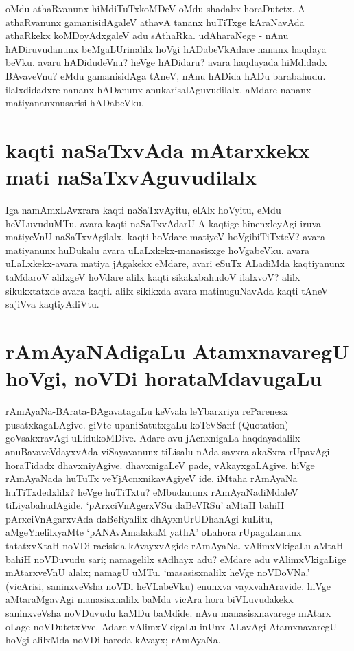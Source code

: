 oMdu athaRvanunx hiMdiTuTxkoMDeV oMdu shadabx horaDutetx. A athaRvanunx gamanisidAgaleV athavA tananx huTiTxge kAraNavAda athaRkekx  koMDoyAdxgaleV adu sAthaRka. udAharaNege - nAnu hADiruvudanunx beMgaLUrinalilx hoVgi hADabeVkAdare nananx haqdaya beVku. avaru hADidudeVnu? heVge hADidaru? avara haqdayada hiMdidadx BAvaveVnu? eMdu gamanisidAga tAneV, nAnu hADida hADu barabahudu. ilalxdidadxre nananx hADanunx anukarisalAguvudilalx. aMdare nananx matiyananxnusarisi hADabeVku.

\section*{kaqti naSaTxvAda mAtarxkekx mati naSaTxvAguvudilalx}

Iga namAmxLAvxrara kaqti naSaTxvAyitu, elAlx hoVyitu, eMdu heVLuvuduMTu. avara kaqti naSaTxvAdarU A kaqtige hinenxleyAgi iruva matiyeVnU naSaTxvAgilalx. kaqti hoVdare matiyeV hoVgibiTiTxteV? avara matiyanunx huDukalu avara uLaLxkekx-manasisxge hoVgabeVku. avara uLaLxkekx-avara matiya jAgakekx eMdare, avari eSuTx ALadiMda kaqtiyanunx taMdaroV alilxgeV hoVdare alilx kaqti sikakxbahudoV ilalxvoV? alilx sikukxtatxde avara kaqti. alilx sikikxda avara matinuguNavAda kaqti tAneV sajiVva kaqtiyAdiVtu.

\section*{rAmAyaNAdigaLu AtamxnavaregU hoVgi, noVDi horataMdavugaLu}

rAmAyaNa-BArata-BAgavatagaLu keVvala leYbarxriya reParenesx pusatxkagaLAgive. giVte-upaniSatutxgaLu koTeVSanf ({\eng Quotation}) goVsakxravAgi uLidukoMDive. Adare avu jAcnxnigaLa haqdayadalilx anuBavaveVdayxvAda viSayavanunx tiLisalu nAda-savxra-akaSxra rUpavAgi horaTidadx dhavxniyAgive. dhavxnigaLeV pade, vAkayxgaLAgive. hiVge rAmAyaNada huTuTx veYjAcnxnikavAgiyeV ide. iMtaha rAmAyaNa huTiTxdedxlilx? heVge huTiTxtu? eMbudanunx rAmAyaNadiMdaleV tiLiyabahudAgide. `pArxciVnAgerxVSu daBeVRSu'\label{231} aMtaH bahiH pArxciVnAgarxvAda daBeRyalilx dhAyxnUrUDhanAgi kuLitu, aMgeYnelilxyaMte `pANAvAmalakaM yathA'\label{232} oLahora rUpagaLanunx tatatxvXtaH noVDi racisida kAvayxvAgide rAmAyaNa. vAlimxVkigaLu aMtaH bahiH noVDuvudu sari; namagelilx sAdhayx adu? eMdare adu vAlimxVkigaLige mAtarxveVnU alalx; namagU uMTu. `masasisxnalilx heVge noVDoVNa.' (vicArisi, saninxveVsha noVDi heVLabeVku) enunxva vayxvahAravide. hiVge aMtaraMgavAgi manasisxnalilx baMda vicAra hora biVLuvudakekx saninxveVsha noVDuvudu kaMDu baMdide. nAvu manasisxnavarege mAtarx oLage noVDutetxVve. Adare vAlimxVkigaLu inUnx ALavAgi AtamxnavaregU hoVgi alilxMda noVDi bareda kAvayx; rAmAyaNa. 

